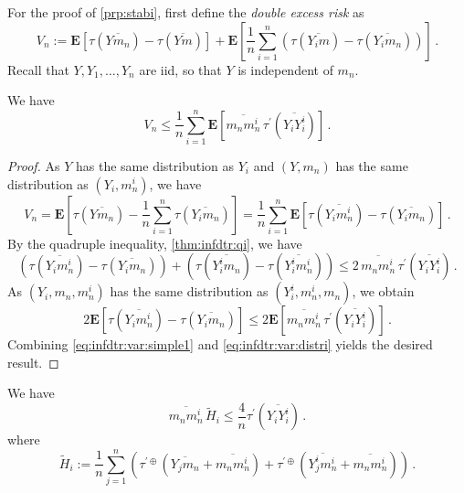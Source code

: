 \documentclass{article}
\newcommand{\lab}{\left[} %
\newcommand{\rab}{\right]} %
\newcommand{\ab}[1]{\lab #1 \rab} %
\newcommand{\abOf}[1]{\!\ab{#1}} %
\newcommand{\lb}{\left(} %
\newcommand{\rb}{\right)} %
\newcommand{\br}[1]{\lb #1 \rb} %
\newcommand{\brOf}[1]{\!\br{#1}} %
\newcommand{\E}{\mathbf{E}} %
\newcommand{\Eof}[1]{\E[#1]}
\newcommand{\EOf}[1]{\E\abOf{#1}}
\newcommand{\pr}{^\prime}
\newcommand{\eqfs}{\,.}
\newcommand{\ol}[2]{\overline{#1#2}}
\newcommand{\tran}{\tau}
\newcommand{\dtran}{\tau\pr}
\newcommand{\ddrtran}{\tau^{\prime\oplus}}
\begin{document}
For the proof of \cref{prp:stabi}, first define the \emph{double excess risk} as
\begin{equation}
	V_n := \EOf{\tran(\ol Y{m_n}) - \tran(\ol Ym)} + \EOf{\frac1n \sum_{i=1}^n \br{\tran(\ol {Y_i}{m}) - \tran(\ol {Y_i}{m_n})} }
	\eqfs
\end{equation}
Recall that $Y, Y_1, \dots, Y_n$ are iid, so that $Y$ is independent of $m_n$.
%
\begin{lemma}\label{lmm:variancebound}
	We have
	\begin{equation}
		V_n \leq \frac1n \sum_{i=1}^n \EOf{\ol {m_n}{m_n^i}\, \dtran(\ol {Y_i}{Y_i^i})}
		\eqfs
	\end{equation}
\end{lemma}
%
\begin{proof}
	As $Y$ has the same distribution as $Y_i$ and $(Y, m_n)$ has the same distribution as $(Y_i, m_n^i)$, we have
	\begin{equation}\label{eq:infdtr:var:simple1}
		V_n 
		=
		\EOf{\tran(\ol Y{m_n}) - \frac1n \sum_{i=1}^n \tran(\ol {Y_i}{m_n})} 
		=
		\frac1n \sum_{i=1}^n \EOf{\tran(\ol {Y_i}{m_n^i}) - \tran(\ol {Y_i}{m_n})} 
		\eqfs
	\end{equation}
	By the quadruple inequality, \cref{thm:infdtr:qi}, we have 
	\begin{equation}
		\br{\tran(\ol {Y_i}{m_n^i}) - \tran(\ol {Y_i}{m_n})}
		+ 
		\br{\tran(\ol {Y_i^i}{m_n}) - \tran(\ol {Y_i^i}{m_n^i})}
		\leq
		2 \, \ol {m_n}{m_n^i}\, \dtran(\ol {Y_i}{Y_i^i})
		\eqfs
	\end{equation}
	As $(Y_i, m_n, m_n^i)$ has the same distribution as $(Y_i^i, m_n^i, m_n)$, we obtain
	\begin{equation}\label{eq:infdtr:var:distri}
		2 \Eof{\tran(\ol {Y_i}{m_n^i}) - \tran(\ol {Y_i}{m_n})} \leq 2 \EOf{\ol {m_n}{m_n^i} \,\dtran(\ol {Y_i}{Y_i^i})}
		\eqfs
	\end{equation}
	Combining \eqref{eq:infdtr:var:simple1} and \eqref{eq:infdtr:var:distri} yields the desired result.
\end{proof}
%
\begin{lemma}\label{lmm:mnmnibound}\mbox{}
	We have
	\begin{equation}
		\ol {m_n}{m_n^i} \, \tilde H_i \leq \frac4n \dtran(\ol {Y_i}{Y_i^i})
		\eqfs
	\end{equation}
	where 
	\begin{equation}\label{eq:lmm:mnmnibound:hi:tran}
		\tilde H_i := \frac1n \sum_{j=1}^n \br{\ddrtran\brOf{\ol {Y_j}{m_n} + \ol {m_n}{m_n^i}} + \ddrtran\brOf{\ol {Y_j^i}{m_n^i} + \ol {m_n}{m_n^i}}}
		\eqfs
	\end{equation}
\end{lemma}
\end{document}
